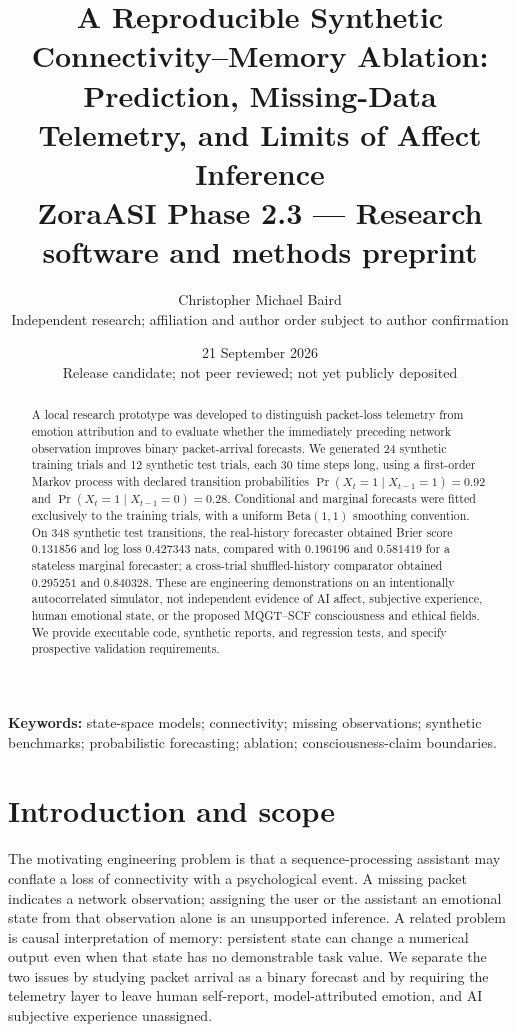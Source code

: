 \documentclass[11pt,a4paper]{article}
\title{\vspace{-1em}\textbf{A Reproducible Synthetic Connectivity--Memory Ablation:\\[4pt]
Prediction, Missing-Data Telemetry, and Limits of Affect Inference}\\[9pt]
\large ZoraASI Phase 2.3 --- Research software and methods preprint}
\author{Christopher Michael Baird\\\small Independent research; affiliation and author order subject to author confirmation}
\date{21 September 2026\\\small Release candidate; not peer reviewed; not yet publicly deposited}
\newcommand{\patt}{\Pr(X_t=1\mid X_{t-1}=1)}
\newcommand{\pabs}{\Pr(X_t=1\mid X_{t-1}=0)}
\begin{document}
\maketitle
\begin{abstract}
A local research prototype was developed to distinguish packet-loss telemetry from emotion attribution and to evaluate whether the immediately preceding network observation improves binary packet-arrival forecasts. We generated 24 synthetic training trials and 12 synthetic test trials, each 30 time steps long, using a first-order Markov process with declared transition probabilities $\patt=0.92$ and $\pabs=0.28$. Conditional and marginal forecasts were fitted exclusively to the training trials, with a uniform Beta$(1,1)$ smoothing convention. On 348 synthetic test transitions, the real-history forecaster obtained Brier score $0.131856$ and log loss $0.427343$ nats, compared with $0.196196$ and $0.581419$ for a stateless marginal forecaster; a cross-trial shuffled-history comparator obtained $0.295251$ and $0.840328$. These are engineering demonstrations on an intentionally autocorrelated simulator, not independent evidence of AI affect, subjective experience, human emotional state, or the proposed MQGT--SCF consciousness and ethical fields. We provide executable code, synthetic reports, and regression tests, and specify prospective validation requirements.
\end{abstract}

\noindent\textbf{Keywords:} state-space models; connectivity; missing observations; synthetic benchmarks; probabilistic forecasting; ablation; consciousness-claim boundaries.

\section{Introduction and scope}
The motivating engineering problem is that a sequence-processing assistant may conflate a loss of connectivity with a psychological event. A missing packet indicates a network observation; assigning the user or the assistant an emotional state from that observation alone is an unsupported inference. A related problem is causal interpretation of memory: persistent state can change a numerical output even when that state has no demonstrable task value. We separate the two issues by studying packet arrival as a binary forecast and by requiring the telemetry layer to leave human self-report, model-attributed emotion, and AI subjective experience unassigned.
\end{document}
